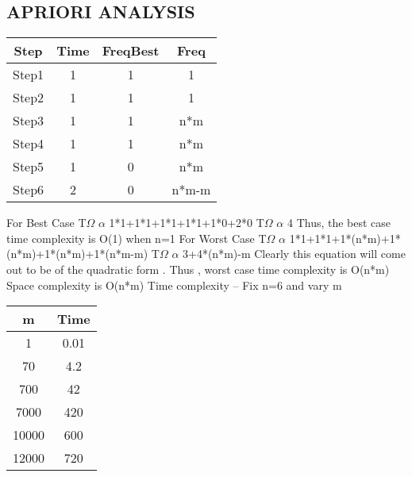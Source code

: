 \documentclass[conference]{IEEEtran}
\begin{document}
\subsection{APRIORI ANALYSIS }
\begin{center}
   \begin{tabular}{|c|c|c|c}
   \hline
   Step&Time&FreqBest&Freq \\
   \hline\hline
    Step1&1&1&1 \\
    \hline
   Step2&1&1&1\\
    \hline
   Step3&1&1&n*m\\
    \hline
   Step4&1&1&n*m\\
    \hline
  Step5&1&0&n*m\\
    \hline
    Step6&2&0&n*m-m \\
    \hline
    \end{tabular} 
\end{center}
For Best Case
\newline
T$\Omega$ $\alpha$ 1*1+1*1+1*1+1*1+1*0+2*0
\newline
T$\Omega$ $\alpha$ 4
\newline
Thus, the best case time complexity is O(1) when n=1
\newline
For Worst Case
\newline
T$\Omega$ $\alpha$ 1*1+1*1+1*(n*m)+1*(n*m)+1*(n*m)+1*(n*m-m)
\newline
T$\Omega$ $\alpha$ 3+4*(n*m)-m
\newline
Clearly this equation will come out to be of the quadratic form .
\newline
Thus , worst case time complexity is O(n*m)
\newline
Space complexity is O(n*m)
\newline
Time complexity –
\newline
Fix n=6 and vary m
\newline
\begin{center}
   \begin{tabular}{|c|c|}
   \hline
   m & Time \\
   \hline\hline
    1 & 0.01 \\
    \hline
    70 & 4.2 \\
    \hline
    700 & 42 \\
    \hline
    7000 & 420 \\
    \hline
    10000 & 600 \\
    \hline
    12000 & 720 \\
    \hline
    \end{tabular} 
\end{center}
\end{document}
